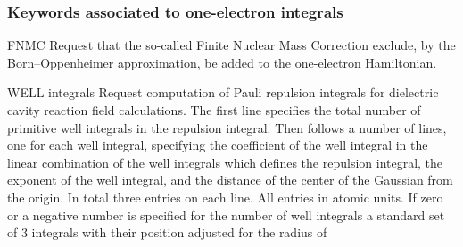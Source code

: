 \subsubsection{Keywords associated to one-{}electron integrals}
\begin{keywordlist}
\item[FNMC]
Request that the so-called Finite Nuclear Mass Correction exclude, by the Born--Oppenheimer approximation,
be added to the one-electron Hamiltonian.
\item[WELL integrals]
Request computation of Pauli repulsion integrals for dielectric
cavity reaction field calculations.
The first line specifies the total number of primitive well integrals in the
repulsion integral. Then follows a number of lines, one for each
well integral, specifying the coefficient of the well integral in the
linear combination of the well integrals which defines the repulsion integral,
the exponent of the well integral, and the distance of the center of the
Gaussian from the origin. In total three entries on each line.
All entries in atomic units.
If zero or a negative number is specified for the number of well integrals
a standard set of 3 integrals with their position adjusted for the radius of

\end{keywordlist}
